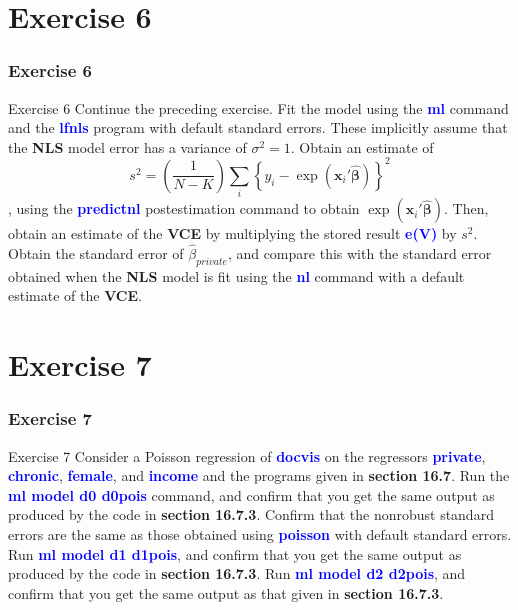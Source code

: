 \documentclass[11pt, aspectratio=169]{beamer}
\begin{document}
	\section{Exercise 6}
		\begin{frame}
			\frametitle{Exercise 6}
			\begin{block}{Exercise 6}
				Continue the preceding exercise. Fit the model using the \textcolor{blue}{\textbf{ml}} command and the
				\textcolor{blue}{\textbf{lfnls}} program with default standard errors. These implicitly assume that the
				\textbf{NLS} model error has a variance of $\sigma^{2} = 1$. Obtain an estimate of 
					\begin{equation}
						s^{2} = \left(\dfrac{1}{N - K}\right) \sum\limits_{i} \left\{y_{i} - \exp\left(\mathbf{x}_{i}'\hat{\mathbf{\beta}}\right) \right\}^{2}
					\end{equation}
				, using the \textcolor{blue}{\textbf{predictnl}} postestimation
				command to obtain $\exp\left(\mathbf{x}_{i}'\hat{\mathbf{\beta}}\right)$. Then, obtain an estimate of the \textbf{VCE} by
				multiplying the stored result \textcolor{blue}{\textbf{e(V)}} by $s^{2}$. Obtain the standard error of $\hat{\beta}_{private}$,
				and compare this with the standard error obtained when the \textbf{NLS} model is fit
				using the \textcolor{blue}{\textbf{nl}} command with a default estimate of the \textbf{VCE}.
			\end{block}
		\end{frame}
	\section{Exercise 7}
		\begin{frame}
			\frametitle{Exercise 7}
			\begin{block}{Exercise 7}
				Consider a Poisson regression of \textcolor{blue}{\textbf{docvis}} on the regressors \textcolor{blue}{\textbf{private}}, \textcolor{blue}{\textbf{chronic}},
				\textcolor{blue}{\textbf{female}}, and \textcolor{blue}{\textbf{income}} and the programs given in \textcolor{red!50}{\textbf{section 16.7}}. Run the \textcolor{blue}{\textbf{ml
			    model d0 d0pois}} command, and confirm that you get the same output as
				produced by the code in \textcolor{red!50}{\textbf{section 16.7.3}}. Confirm that the nonrobust standard
				errors are the same as those obtained using \textcolor{blue}{\textbf{poisson}} with default standard
				errors. Run \textcolor{blue}{\textbf{ml model d1 d1pois}}, and confirm that you get the same output as
				produced by the code in \textcolor{red!50}{\textbf{section 16.7.3}}. Run \textcolor{blue}{\textbf{ml model d2 d2pois}}, and confirm
				that you get the same output as that given in \textcolor{red!50}{\textbf{section 16.7.3}}.
			\end{block}
		\end{frame}
\end{document}
